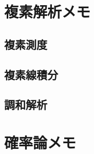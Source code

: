 \documentclass[a4j,10.5pt,oneside,openany]{jsbook}
\theoremstyle{mystyle}
\begin{document}
\chapter{複素解析メモ}
	\section{複素測度}
		
		
		
	\section{複素線積分}
		
		
		
		
		
		
		
		
		
		
		
	\section{調和解析}
		
%

\chapter{確率論メモ}
	
	
	
	
	
	
	
	
	
	
	
	
	

%	

\newpage
\printindex


%
%
\end{document}
